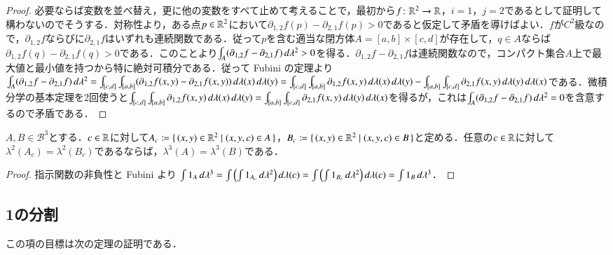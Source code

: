 \begin{proof}
必要ならば変数を並べ替え，更に他の変数をすべて止めて考えることで，最初から$f\colon \mathbb{R}^2 \to \mathbb{R}$，$i=1$，$j=2$であるとして証明して構わないのでそうする．対称性より，ある点$p \in \mathbb{R}^2$において$\partial_{1,2} f (p) - \partial_{2,1} f (p) > 0$であると仮定して矛盾を導けばよい．$f$が$C^2$級なので，$\partial_{1,2}f$ならびに$\partial_{2,1}f$はいずれも連続関数である．従って$p$を含む適当な閉方体$A = [a,b] \times [c,d]$が存在して，$q \in A$ならば$\partial_{1,2} f (q) - \partial_{2,1} f(q) > 0$である．このことより$\int_A (\partial_{1,2} f - \partial_{2,1} f) \mathop{}\!d\lambda^2 > 0$を得る．$\partial_{1,2} f - \partial_{2,1} f$は連続関数なので，コンパクト集合$A$上で最大値と最小値を持つから特に絶対可積分である．従って Fubini の定理より$\int_A (\partial_{1,2} f - \partial_{2,1} f) \mathop{}\!d\lambda^2 = \int_{[c,d]} \int_{[a,b]}(\partial_{1,2} f(x,y) - \partial_{2,1} f(x,y)) \mathop{}\!d\lambda(x) \mathop{}\!d\lambda(y) = \int_{[c,d]} \int_{[a,b]}\partial_{1,2} f(x,y) \mathop{}\!d\lambda(x) \mathop{}\!d\lambda(y) - \int_{[a,b]} \int_{[c,d]}\partial_{2,1} f(x,y) \mathop{}\!d\lambda(y) \mathop{}\!d\lambda(x)$である．微積分学の基本定理を2回使うと$\int_{[c,d]} \int_{[a,b]}\partial_{1,2} f(x,y) \mathop{}\!d\lambda(x) \mathop{}\!d\lambda(y) = \int_{[a,b]} \int_{[c,d]}\partial_{2,1} f(x,y) \mathop{}\!d\lambda(y) \mathop{}\!d\lambda(x)$を得るが，これは$\int_A (\partial_{1,2} f - \partial_{2,1} f) \mathop{}\!d\lambda^2 = 0$を含意するので矛盾である．
\end{proof}

\begin{prop}
$A, B \in \mathcal{B}^3$とする．$c \in \mathbb{R}$に対して$A_c \coloneqq \set{(x,y) \in \mathbb{R}^2 | (x,y,c) \in A }$，$B_c \coloneqq \set{(x,y) \in \mathbb{R}^2 | (x,y,c) \in B }$と定める．任意の$c \in \mathbb{R}$に対して$\lambda^2(A_c) = \lambda^2(B_c)$であるならば，$\lambda^3(A) = \lambda^3(B)$である．
\end{prop}

\begin{proof}指示関数の非負性と Fubini より
$\int 1_A \mathop{}\!d\lambda^3 = \int \left(\int 1_{A_c}  \mathop{}\!d\lambda^2\right) \mathop{}\!d\lambda(c) = \int \left(\int 1_{B_c}  \mathop{}\!d\lambda^2\right) \mathop{}\!d\lambda(c) = \int 1_B \mathop{}\!d\lambda^3$．
\end{proof}

\subsection{1の分割}

この項の目標は次の定理の証明である．

